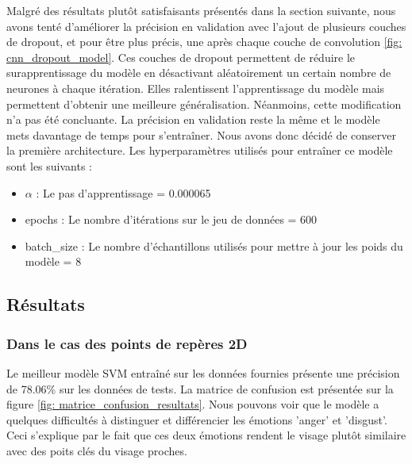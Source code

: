 \documentclass{rapport}
\begin{document}
Malgré des résultats plutôt satisfaisants présentés dans la section suivante, nous avons tenté d'améliorer la précision en validation avec
l'ajout de plusieurs couches de dropout, et pour être plus précis, une après chaque couche de convolution \ref*{fig: cnn_dropout_model}. Ces couches
de dropout permettent de réduire le surapprentissage du modèle en désactivant aléatoirement un certain nombre de neurones à chaque itération.
Elles ralentissent l'apprentissage du modèle mais permettent d'obtenir une meilleure généralisation. Néanmoins, cette modification n'a pas
été concluante. La précision en validation reste la même et le modèle mets davantage de temps pour s'entraîner. Nous avons donc décidé
de conserver la première architecture. Les hyperparamètres utilisés pour entraîner ce modèle sont les suivants :

\begin{itemize}
    \item $\alpha$ : Le pas d'apprentissage = 0.000065
    \item epochs : Le nombre d'itérations sur le jeu de données = 600
    \item batch\_size : Le nombre d'échantillons utilisés pour mettre à jour les poids du modèle = 8
\end{itemize}


\subsection{Résultats}

\subsubsection{Dans le cas des points de repères 2D}

Le meilleur modèle SVM entraîné sur les données fournies présente une précision de 78.06\% sur les données de tests. La matrice de confusion est présentée
sur la figure \ref*{fig: matrice_confusion_resultats}. Nous pouvons voir que le modèle a quelques difficultés à distinguer
et différencier les émotions 'anger' et 'disgust'. Ceci s'explique par le fait que ces deux émotions rendent le visage plutôt similaire avec
des poits clés du visage proches.\\

\end{document}
